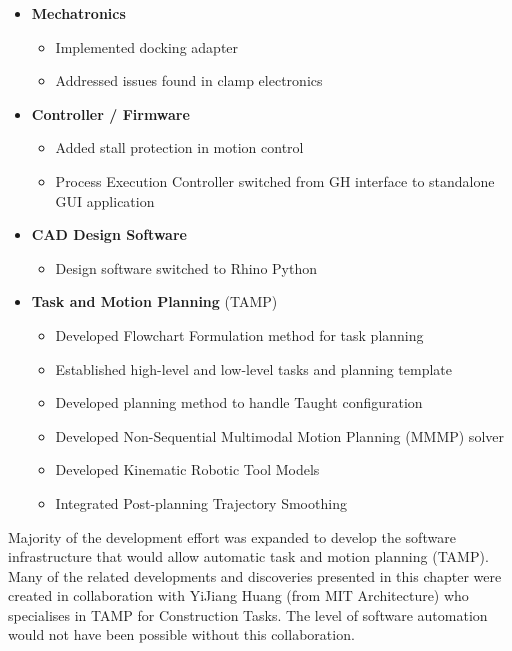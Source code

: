 \documentclass[11pt]{book}
\begin{document}
\begin{itemize}
	\item \textbf{Mechatronics}

\begin{itemize}
	\item Implemented docking adapter

	\item Addressed issues found in clamp electronics

\end{itemize}
	\item \textbf{Controller / Firmware}

\begin{itemize}
	\item Added stall protection in motion control

	\item Process Execution Controller switched from GH interface to standalone GUI application

\end{itemize}
	\item \textbf{CAD Design Software}

\begin{itemize}
	\item Design software switched to Rhino Python

\end{itemize}
	\item \textbf{Task and Motion Planning }(TAMP)

\begin{itemize}
	\item Developed Flowchart Formulation method for task planning

	\item Established high-level and low-level tasks and planning template

	\item Developed planning method to handle Taught configuration

	\item Developed Non-Sequential Multimodal Motion Planning (MMMP) solver

	\item Developed Kinematic Robotic Tool Models

	\item Integrated Post-planning Trajectory Smoothing

\end{itemize}
\end{itemize}
Majority of the development effort was expanded to develop the software infrastructure that would allow automatic task and motion planning (TAMP). Many of the related developments and discoveries presented in this chapter were created in collaboration with YiJiang Huang (from MIT Architecture) who specialises in TAMP for Construction Tasks. The level of software automation would not have been possible without this collaboration.
\end{document}
